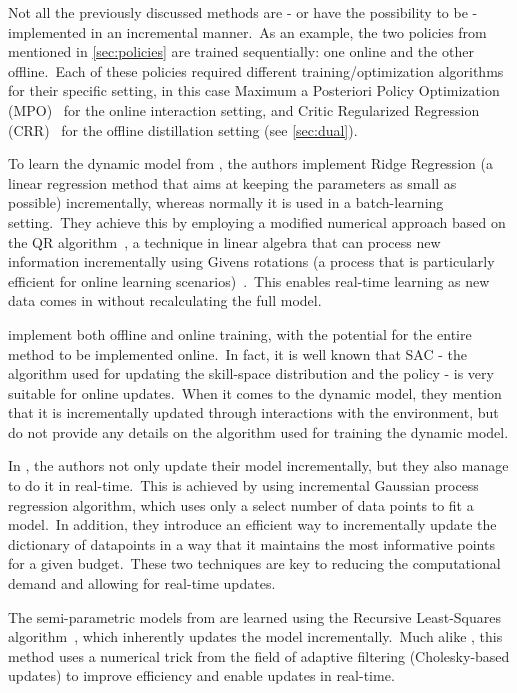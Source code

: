 Not all the previously discussed methods are - or have the possibility to be - implemented in an incremental manner.\ As an example, the two policies from \textcite{Zhou2022} mentioned in \cref{sec:policies} are trained sequentially: one online and the other offline.\ Each of these policies required different training/optimization algorithms for their specific setting, in this case Maximum a Posteriori Policy Optimization (MPO)~\cite{Abdolmaleki2018} for the online interaction setting, and Critic Regularized Regression (CRR)~\cite{Wang2020} for the offline distillation setting (see \cref{sec:dual}).

To learn the dynamic model from \textcite{Gijsberts2011}, the authors implement Ridge Regression (a linear regression method that aims at keeping the parameters as small as possible) incrementally, whereas normally it is used in a batch-learning setting.\ They achieve this by employing a modified numerical approach based on the QR algorithm~\cite{Sayed2008}, a technique in linear algebra that can process new information incrementally using Givens rotations (a process that is particularly efficient for online learning scenarios)~\cite{Bjorck1996}.\ This enables real-time learning as new data comes in without recalculating the full model.

\textcite{Lu2020} implement both offline and online training, with the potential for the entire method to be implemented online.\ In fact, it is well known that SAC - the algorithm used for updating the skill-space distribution and the policy - is very suitable for online updates.\ When it comes to the dynamic model, they mention that it is incrementally updated through interactions with the environment, but do not provide any details on the algorithm used for training the dynamic model.

In \textcite{Nguyen2011}, the authors not only update their model incrementally, but they also manage to do it in real-time.\ This is achieved by using incremental Gaussian process regression algorithm, which uses only a select number of data points to fit a model.\ In addition, they introduce an efficient way to incrementally update the dictionary of datapoints in a way that it maintains the most informative points for a given budget.\ These two techniques are key to reducing the computational demand and allowing for real-time updates.

The semi-parametric models from \textcite{Romeres2016} are learned using the Recursive Least-Squares algorithm~\cite{Landau2011}, which inherently updates the model incrementally.\ Much alike \textcite{Gijsberts2011}, this method uses a numerical trick from the field of adaptive filtering (Cholesky-based updates) to improve efficiency and enable updates in real-time.


